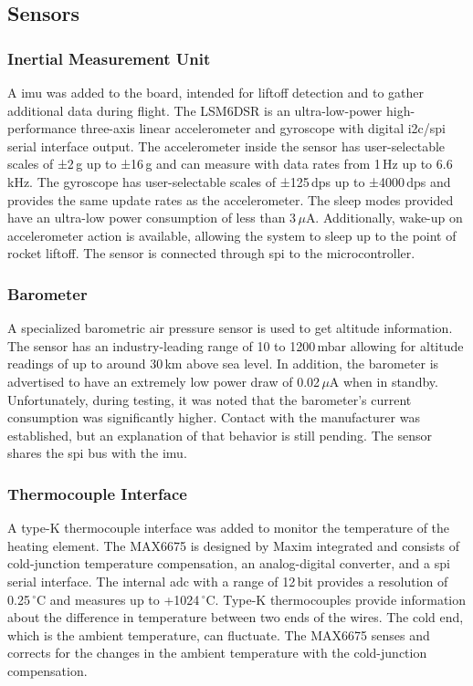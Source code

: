\subsection{Sensors}
\subsubsection{Inertial Measurement Unit}
A \acrfull{imu} was added to the board, intended for liftoff detection and to gather additional data during flight. The LSM6DSR is an ultra-low-power high-performance three-axis linear accelerometer and gyroscope with digital \acrshort{i2c}/\acrshort{spi} serial interface output. The accelerometer inside the sensor has user-selectable scales of ±2\,g up to ±16\,g and can measure with data rates from 1\,Hz up to 6.6\,kHz. The gyroscope has user-selectable scales of ±125\,dps up to ±4000\,dps and provides the same update rates as the accelerometer. The sleep modes provided have an ultra-low power consumption of less than 3\,$\mu$A. Additionally, wake-up on accelerometer action is available, allowing the system to sleep up to the point of rocket liftoff. The sensor is connected through \acrshort{spi} to the microcontroller.

\subsubsection{Barometer}\label{barometer}
A specialized barometric air pressure sensor is used to get altitude information. The sensor has an industry-leading range of 10 to 1200\,mbar allowing for altitude readings of up to around 30\,km above sea level. In addition, the barometer is advertised to have an extremely low power draw of 0.02\,$\mu$A when in standby. Unfortunately, during testing, it was noted that the barometer's current consumption was significantly higher. Contact with the manufacturer was established, but an explanation of that behavior is still pending. The sensor shares the \acrshort{spi} bus with the \acrshort{imu}.

\subsubsection{Thermocouple Interface}
A type-K thermocouple interface was added to monitor the temperature of the heating element. The MAX6675 is designed by Maxim integrated and consists of cold-junction temperature compensation, an analog-digital converter, and a \acrshort{spi} serial interface. The internal \acrshort{adc} with a range of 12\,bit provides a resolution of 0.25\,$^\circ$C and measures up to +1024\,$^\circ$C. Type-K thermocouples provide information about the difference in temperature between two ends of the wires. The cold end, which is the ambient temperature, can fluctuate. The MAX6675 senses and corrects for the changes in the ambient temperature with the cold-junction compensation.

